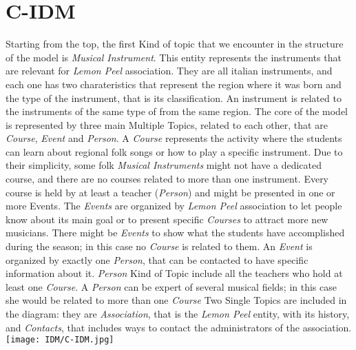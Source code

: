 \documentclass[../../DD.tex]{subfiles}
\begin{document}
\section{C-IDM \label{sect:2.1}}
	Starting from the top, the first Kind of topic that we encounter in the structure of the model is \textit{Musical Instrument}. This entity represents the instruments that are relevant for \textit{Lemon Peel} association. They are all italian instruments, and each one has two charateristics that represent the region where it was born and the type of the instrument, that is its classification. An instrument is related to the instruments of the same type of from the same region.
	\newline
	The core of the model is represented by three main Multiple Topics, related to each other, that are \textit{Course}, \textit{Event} and \textit{Person}. A \textit{Course} represents the activity where the students can learn about regional folk songs or how to play a specific instrument. Due to their simplicity, some folk \textit{Musical Instruments} might not have a dedicated course, and there are no courses related to more than one instrument. Every course is held by at least a teacher (\textit{Person}) and might be presented in one or more Events.
	\newline
	The \textit{Events} are organized by \textit{Lemon Peel} association to let people know about its main goal or to present specific \textit{Courses} to attract more new musicians. There might be \textit{Events} to show what the students have accomplished during the season; in this case no \textit{Course} is related to them. An \textit{Event} is organized by exactly one \textit{Person}, that can be contacted to have specific information about it. 
	\newline
	\textit{Person} Kind of Topic include all the teachers who hold at least one \textit{Course}. A \textit{Person} can be expert of several musical fields; in this case she would be related to more than one \textit{Course}
	\newline
	Two Single Topics are included in the diagram: they are \textit{Association}, that is the \textit{Lemon Peel} entity, with its history, and \textit{Contacts}, that includes ways to contact the administrators of the association.
	\newline
	\texttt{[image: IDM/C-IDM.jpg]}
\end{document}
